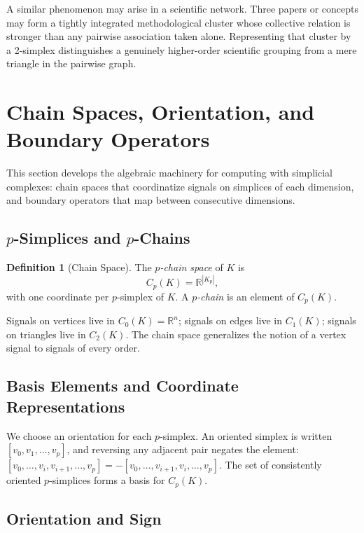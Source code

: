 \documentclass[11pt]{article}
\theoremstyle{definition}
\newtheorem{definition}[theorem]{Definition}
\theoremstyle{remark}
\newcommand{\R}{\mathbb{R}}
\begin{document}
A similar phenomenon may arise in a scientific network. Three papers or concepts may form a tightly integrated methodological cluster whose collective relation is stronger than any pairwise association taken alone. Representing that cluster by a 2-simplex distinguishes a genuinely higher-order scientific grouping from a mere triangle in the pairwise graph.


\section{Chain Spaces, Orientation, and Boundary Operators}
\label{sec:chains}

This section develops the algebraic machinery for computing with simplicial
complexes: chain spaces that coordinatize signals on simplices of each
dimension, and boundary operators that map between consecutive dimensions.

\subsection{\texorpdfstring{$p$-Simplices and $p$-Chains}{p-Simplices and p-Chains}}

\begin{definition}[Chain Space]
The \emph{$p$-chain space} of $K$ is
\[
  C_p(K) = \R^{|K_p|},
\]
with one coordinate per $p$-simplex of $K$. A \emph{$p$-chain} is an element
of $C_p(K)$.
\end{definition}

Signals on vertices live in $C_0(K)=\R^n$; signals on edges live in $C_1(K)$;
signals on triangles live in $C_2(K)$. The chain space generalizes the notion
of a vertex signal to signals of every order.

\subsection{Basis Elements and Coordinate Representations}

We choose an orientation for each $p$-simplex. An oriented simplex is written
$[v_0,v_1,\dots,v_p]$, and reversing any adjacent pair negates the element:
$[v_0,\dots,v_i,v_{i+1},\dots,v_p] = -[v_0,\dots,v_{i+1},v_i,\dots,v_p]$.
The set of consistently oriented $p$-simplices forms a basis for $C_p(K)$.

\subsection{Orientation and Sign}
\end{document}
